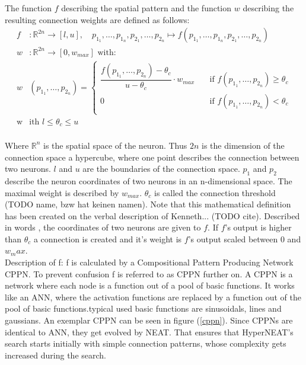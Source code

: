  The function $f$ describing the spatial pattern and the function  $w$ describing the resulting connection weights are defined as follows: 
\begin{align*} \label{HyperNEatFunction}
 f&\colon \mathbb{R}^{2n} \to [l,u], \quad  p_{1_1},\ldots,p_{1_n},p_{2_1},\ldots,p_{2_n} \mapsto f(p_{1_1},\ldots,p_{1_n},p_{2_1},\ldots,p_{2_n})\\
 w&\colon \mathbb{R}^{2n} \to [0,w_{max}] \text{ with: }\\
 w&(p_{1_1},\ldots,p_{2_n})=\begin{cases}
 \dfrac{f(p_{1_1},\ldots,p_{2_n})-\theta_c}{u-\theta_c} \cdot w_{max} & \quad \text{if } f(p_{1_1},\ldots,p_{2_n}) \geq \theta_c \\
 0 & \quad \text{if } f(p_{1_1},\ldots,p_{2_n}) < \theta_c \\
 \end{cases}\\
 \text{w}&\text{ith } l\leq \theta_c \leq u  
 \end{align*}\\
 Where $\mathbb{R}^n$ is the spatial space of the neuron. Thus $2n$ is the dimension of the connection space a hypercube, where one point describes the connection between two neurons. $l$ and $u$ are the boundaries of the connection space. $p_1$ and $p_2$ describe the neuron coordinates of two neurons in an n-dimensional space. The maximal weight is described by $w_{max}$. $\theta_c$ is called the connection threshold (TODO name, bzw hat keinen namen).
 Note that this mathematical definition has been created on the verbal description of Kenneth... (TODO cite). Described in words , the coordinates of two neurons are given to $f$. If $f$'s output is higher than $\theta_c$ a connection is created and it's weight is $f$'s output scaled between $0$ and $w_max$.\\
Description of f:
f is calculated by a Compositional Pattern Producing Network CPPN. To prevent confusion f is referred to as CPPN further on. A CPPN is a network where each node is a function out of a pool of basic functions. It works like an ANN, where the activation functions are replaced by a function out of the pool of basic functions.typical used basic functions are sinusoidals, lines and gaussians. An exemplar CPPN can be seen in figure (\ref{cppn}).
Since CPPNs are identical to ANN, they get evolved by NEAT. That ensures that HyperNEAT's search starts initially with simple connection patterns, whose complexity gets increased during the search. 
